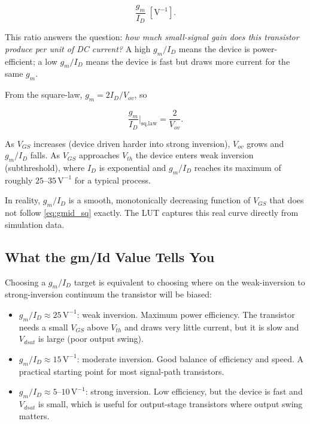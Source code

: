 \documentclass[conference]{IEEEtran}
\begin{document}
\begin{equation}
  \frac{g_m}{I_D} \;\left[\text{V}^{-1}\right].
  \label{eq:gmid}
\end{equation}

This ratio answers the question: \textit{how much small-signal gain does
this transistor produce per unit of DC current?}  A high $g_m/I_D$ means
the device is power-efficient; a low $g_m/I_D$ means the device is fast
but draws more current for the same $g_m$.

From the square-law, $g_m = 2 I_D / V_{ov}$, so

\begin{equation}
  \frac{g_m}{I_D}\bigg|_{\text{sq.law}} = \frac{2}{V_{ov}}.
  \label{eq:gmid_sq}
\end{equation}

As $V_{GS}$ increases (device driven harder into strong inversion), $V_{ov}$
grows and $g_m/I_D$ falls.  As $V_{GS}$ approaches $V_{th}$ the device
enters weak inversion (subthreshold), where $I_D$ is exponential and
$g_m/I_D$ reaches its maximum of roughly $25$--$35\,\text{V}^{-1}$ for a
typical process.

In reality, $g_m/I_D$ is a smooth, monotonically decreasing function of
$V_{GS}$ that does not follow \eqref{eq:gmid_sq} exactly.  The LUT captures
this real curve directly from simulation data.

\subsection{What the gm/Id Value Tells You}

Choosing a $g_m/I_D$ target is equivalent to choosing where on the
weak-inversion to strong-inversion continuum the transistor will be biased:

\begin{itemize}
  \item $g_m/I_D \approx 25\,\text{V}^{-1}$: weak inversion.  Maximum
        power efficiency.  The transistor needs a small $V_{GS}$ above
        $V_{th}$ and draws very little current, but it is slow and
        $V_{dsat}$ is large (poor output swing).
  \item $g_m/I_D \approx 15\,\text{V}^{-1}$: moderate inversion.  Good
        balance of efficiency and speed.  A practical starting point for
        most signal-path transistors.
  \item $g_m/I_D \approx 5$--$10\,\text{V}^{-1}$: strong inversion.  Low
        efficiency, but the device is fast and $V_{dsat}$ is small, which
        is useful for output-stage transistors where output swing matters.
\end{itemize}
\end{document}
